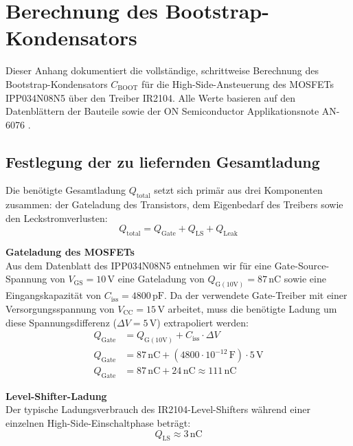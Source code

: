 
\section{Berechnung des Bootstrap-Kondensators}
\label{app:bootstrap}

Dieser Anhang dokumentiert die vollständige, schrittweise Berechnung des Bootstrap-Kondensators $C_{\mathrm{BOOT}}$ für die High-Side-Ansteuerung des MOSFETs IPP034N08N5 über den Treiber IR2104. Alle Werte basieren auf den Datenblättern der Bauteile sowie der ON Semiconductor Applikationsnote AN-6076 \cite{AN6076}.

\subsection{Festlegung der zu liefernden Gesamtladung}
Die benötigte Gesamtladung $Q_{\mathrm{total}}$ setzt sich primär aus drei Komponenten zusammen: der Gateladung des Transistors, dem Eigenbedarf des Treibers sowie den Leckstromverlusten:
\begin{equation}
    Q_{\mathrm{total}} = Q_{\mathrm{Gate}} + Q_{\mathrm{LS}} + Q_{\mathrm{Leak}}
\end{equation}

\textbf{Gateladung des MOSFETs}\\
Aus dem Datenblatt des IPP034N08N5 entnehmen wir für eine Gate-Source-Spannung von $V_{\mathrm{GS}} = 10\,\mathrm{V}$ eine Gateladung von $Q_{\mathrm{G(10V)}} = 87\,\mathrm{nC}$ sowie eine Eingangskapazität von $C_{\mathrm{iss}} = 4800\,\mathrm{pF}$. Da der verwendete Gate-Treiber mit einer Versorgungsspannung von $V_{\mathrm{CC}} = 15\,\mathrm{V}$ arbeitet, muss die benötigte Ladung um diese Spannungsdifferenz ($\Delta V = 5\,\mathrm{V}$) extrapoliert werden:
\begin{align}
    Q_{\mathrm{Gate}} &= Q_{\mathrm{G(10V)}} + C_{\mathrm{iss}} \cdot \Delta V \\
    Q_{\mathrm{Gate}} &= 87\,\mathrm{nC} + (4800 \cdot 10^{-12}\,\mathrm{F}) \cdot 5\,\mathrm{V} \\
    Q_{\mathrm{Gate}} &= 87\,\mathrm{nC} + 24\,\mathrm{nC} \approx 111\,\mathrm{nC}
\end{align}

\textbf{Level-Shifter-Ladung}\\
Der typische Ladungsverbrauch des IR2104-Level-Shifters während einer einzelnen High-Side-Einschaltphase beträgt:
\begin{equation}
    Q_{\mathrm{LS}} \approx 3\,\mathrm{nC}
\end{equation}

